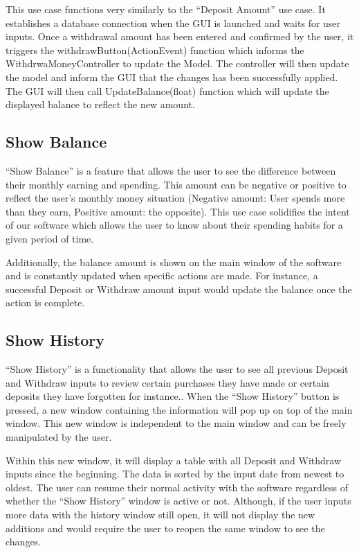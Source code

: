 \documentclass[12pt]{article}
\begin{document}
This use case functions very similarly to the “Deposit Amount” use case. It establishes a database connection when the GUI is launched and waits for user inputs. Once a withdrawal amount has been entered and confirmed by the user, it triggers the withdrawButton(ActionEvent) function which informs the WithdrwaMoneyController to update the Model. The controller will then update the model and inform the GUI that the changes has been successfully applied. The GUI will then call UpdateBalance(float) function which will update the displayed balance to reflect the new amount.

\subsection{Show Balance} 
“Show Balance” is a feature that allows the user to see the difference between their monthly earning and spending. This amount can be negative or positive to reflect the user’s monthly money situation (Negative amount: User spends more than they earn, Positive amount: the opposite). This use case solidifies the intent of our software which allows the user to know about their spending habits for a given period of time.

Additionally, the balance amount is shown on the main window of the software and is constantly updated when specific actions are made. For instance, a successful Deposit or Withdraw amount input would update the balance once the action is complete. 


\subsection{Show History} 
“Show History” is a functionality that allows the user to see all previous Deposit and Withdraw inputs to review certain purchases they have made or certain deposits they have forgotten for instance.. When the “Show History” button is pressed, a new window containing the information will pop up on top of the main window. This new window is independent to the main window and can be freely manipulated by the user. 

Within this new window, it will display a table with all Deposit and Withdraw inputs since the beginning. The data is sorted by the input date from newest to oldest. The user can resume their normal activity with the software regardless of whether the “Show History” window is active or not. Although, if the user inputs more data with the history window still open, it will not display the new additions and would require the user to reopen the same window to see the changes.
\end{document}
